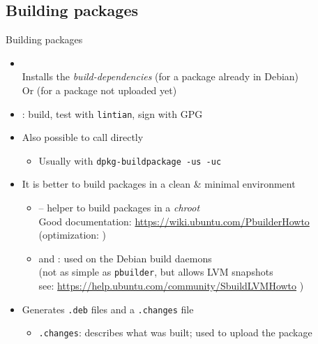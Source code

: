 \documentclass[10pt,final]{beamer}
\begin{document}
\subsection{Building packages}
\begin{frame}{Building packages}
  \begin{itemize}
  \item {}\\
    Installs the \textsl{build-dependencies} (for a package already in Debian)\\
    Or  (for a package not uploaded yet)
    
    \br
  \item {}: build, test with \texttt{lintian}, sign with GPG
    \br
  \item Also possible to call  directly
    \begin{itemize}
    \item Usually with \texttt{dpkg-buildpackage -us -uc}
    \end{itemize}
    \br
  \item It is better to build packages in a clean \& minimal environment
    \begin{itemize}
    \item {} -- helper to build packages in a \textsl{chroot}\\
      Good documentation: \url{https://wiki.ubuntu.com/PbuilderHowto}\\
      (optimization:   )
      \hbr
    \item {} and : used on the Debian build daemons\\
      (not as simple as \texttt{pbuilder}, but allows LVM snapshots\\
       see: \url{https://help.ubuntu.com/community/SbuildLVMHowto} )
    \end{itemize}
    \br
  \item Generates \texttt{.deb} files and a \texttt{.changes} file
    \begin{itemize}
    \item \texttt{.changes}: describes what was built; used to upload the package
    \end{itemize}
  \end{itemize}
\end{frame}
\end{document}
